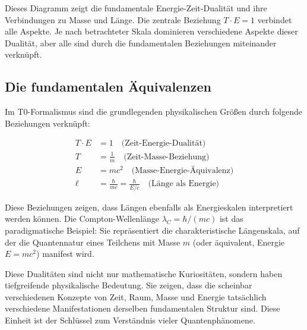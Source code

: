 \begin{center}
	\end{center}
	
	Dieses Diagramm zeigt die fundamentale Energie-Zeit-Dualität und ihre Verbindungen zu Masse und Länge. Die zentrale Beziehung $T \cdot E = 1$ verbindet alle Aspekte. Je nach betrachteter Skala dominieren verschiedene Aspekte dieser Dualität, aber alle sind durch die fundamentalen Beziehungen miteinander verknüpft.
	
	\subsection{Die fundamentalen Äquivalenzen}
	
	Im T0-Formalismus sind die grundlegenden physikalischen Größen durch folgende Beziehungen verknüpft:
	
	\begin{align}
		T \cdot E &= 1 \quad \text{(Zeit-Energie-Dualität)} \\
		T &= \frac{1}{m} \quad \text{(Zeit-Masse-Beziehung)} \\
		E &= mc^2 \quad \text{(Masse-Energie-Äquivalenz)} \\
		\ell &= \frac{\hbar}{mc} = \frac{\hbar}{E/c} \quad \text{(Länge als Energie)}
	\end{align}
	
	Diese Beziehungen zeigen, dass Längen ebenfalls als Energieskalen interpretiert werden können. Die Compton-Wellenlänge $\lambda_C = \hbar/(mc)$ ist das paradigmatische Beispiel: Sie repräsentiert die charakteristische Längenskala, auf der die Quantennatur eines Teilchens mit Masse $m$ (oder äquivalent, Energie $E = mc^2$) manifest wird.
	
	Diese Dualitäten sind nicht nur mathematische Kuriositäten, sondern haben tiefgreifende physikalische Bedeutung. Sie zeigen, dass die scheinbar verschiedenen Konzepte von Zeit, Raum, Masse und Energie tatsächlich verschiedene Manifestationen derselben fundamentalen Struktur sind. Diese Einheit ist der Schlüssel zum Verständnis vieler Quantenphänomene.
	
